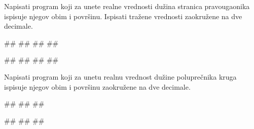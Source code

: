 \begin{Exercise}[label=p1.1_02] 
Napisati program koji za unete realne vrednosti dužina stranica pravougaonika ispisuje njegov obim i površinu. Ispisati tražene vrednosti zaokružene na dve decimale.

\begin{miditest}
\begin{upotreba}{1}
#\naslovInt#
##
##
##
\end{upotreba}
\end{miditest}
\begin{miditest}
\begin{upotreba}{2}
#\naslovInt#
##
##
##
\end{upotreba}
\end{miditest}

\end{Exercise}
\ifresenja
\begin{Answer}[ref=p1.1_02]
\end{Answer}
\fi

\begin{Exercise}[label=v1.1_04] 
Napisati program koji za unetu realnu vrednost dužine poluprečnika kruga ispisuje njegov obim i površinu zaokružene na dve decimale. 
      
\begin{miditest}
\begin{upotreba}{1}
#\naslovInt#
##
##
\end{upotreba}
\end{miditest}
\begin{miditest}
\begin{upotreba}{2}
#\naslovInt#
##
##
\end{upotreba}
\end{miditest}   
   
\end{Exercise}
\ifresenja
\begin{Answer}[ref=v1.1_04]
\end{Answer}
\fi



